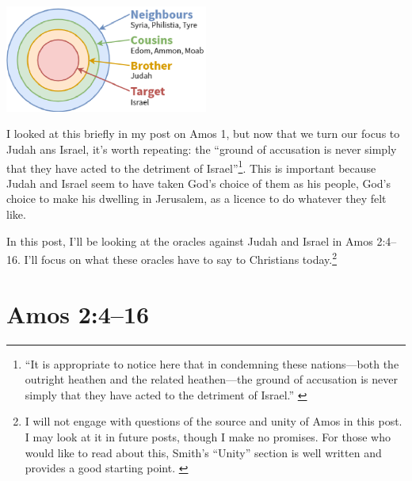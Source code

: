 \begin{center}
    \includegraphics[width=0.5\textwidth]{amos-2-target.eps}
\end{center}

I looked at this briefly in my post on Amos 1, but now that we turn our focus to
Judah ans Israel, it's worth repeating: the \enquote{ground of accusation is
never simply that they have acted to the detriment of Israel}\footnote{%
    \enquote{It is appropriate to notice here that in condemning these
    nations---both the outright heathen and the related heathen---the ground of
    accusation is never simply that they have acted to the detriment of Israel.}
    \autocite[50]{motyer:2011}
}. This is important because Judah and Israel seem to
have taken God's choice of them as his people, God's choice to make his dwelling
in Jerusalem, as a licence to do whatever they felt like.

In this post, I'll be looking at the oracles against Judah and Israel in Amos
2:4--16. I'll focus on what these oracles have to say to Christians
today.\footnote{%
    I will not engage with questions of the source and unity of Amos in this
    post. I may look at it in future posts, though I make no promises. For those
    who would like to read about this, Smith's \enquote{Unity} section is well
    written and provides a good starting point.
    \autocite[See][110--114]{smith:2017}
}

\section{Amos 2:4--16}

